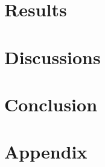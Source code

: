 \documentclass[11pt,a4paper,]{article}
\begin{document}
\section{Results}\label{results}

\section{Discussions}\label{discussions}

\section{Conclusion}\label{conclusion}

\section{Appendix}\label{appendix}

\newpage

\printbibliography[title=Reference]
\end{document}
